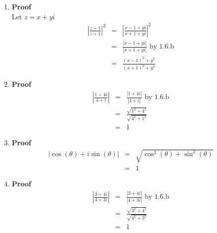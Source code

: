 \documentclass{article}%
\newcommand\abs[1]{\left|#1\right|}
\newenvironment{proof}[1][]{\begin{samepage}\textbf{Proof #1} }{\end{samepage}}
\begin{document}
\begin{enumerate}
\begin{enumerate}[label*=\arabic*.]
\begin{enumerate}[label=\alph*]
            \item %
            \begin{proof}
                \\ Let $z=x+yi$
                \begin{eqnarray*}
                    \abs{\frac{z-1}{z+1}}^2&=&\abs{\frac{x-1+yi}{x+1+yi}}^2 \\
                                           &=&\frac{\abs{x-1+yi}}{\abs{x+1+yi}} \text{ by 1.6.b} \\
                                           &=&\frac{(x-1)^2+y^2}{(x+1)^2+y^2}
                \end{eqnarray*}
            \end{proof}
            \item %
            \begin{proof}
                \begin{eqnarray*}
                    \abs{\frac{1+4i}{4+i}}&=&\frac{\abs{1+4i}}{\abs{4+i}} \text{ by 1.6.b} \\
                                          &=&\frac{\sqrt{1^2+4^2}}{\sqrt{4^2+1^2}} \\
                                          &=&1
                \end{eqnarray*}
            \end{proof}
            \item %
            \begin{proof}
                \begin{eqnarray*}
                    \abs{\cos(\theta)+i \sin(\theta)}&=&\sqrt{\cos^2(\theta)+\sin^2(\theta)} \\
                                                     &=&1
                \end{eqnarray*}
            \end{proof}
            \item %
            \begin{proof}
                \begin{eqnarray*}
                    \abs{\frac{3+4i}{4+3i}}&=&\frac{\abs{3+4i}}{\abs{4+3i}} \text{ by 1.6.b} \\
                                           &=&\frac{\sqrt{3^2+4^2}}{\sqrt{4^2+3^2}} \\
                                           &=&1
                \end{eqnarray*}
            \end{proof}
        \end{enumerate}

\end{enumerate}
\end{enumerate}
\end{document}
